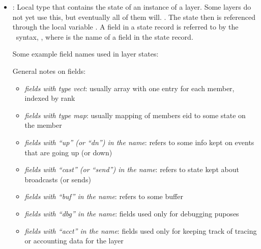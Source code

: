 \begin{itemize}
\item
{} : Local type that contains the state of an instance of a
layer.  Some layers do not yet use this, but eventually all of them will.
.  The state then is referenced
through the local variable .  A field in a state record is
referred to by the \caml\ syntax, , where  is
the name of a field in the state record.

Some example field names used in layer states:

\begin{itemize}
\end{itemize}

General notes on fields:
\begin{itemize}
\item{\em fields with type vect}: usually array with one entry for each member, indexed by rank
\item{\em fields with type map}: usually mapping of members eid to some state on the member
\item{\em fields with ``up'' (or ``dn'') in the name}: refers to some info kept on
  events that are going up (or down)
\item{\em fields with ``cast'' (or ``send'') in the name}: refers to state
  kept about broadcasts (or sends)
\item{\em fields with ``buf'' in the name}: refers to some buffer
\item{\em fields with ``dbg'' in the name}: fields used only for debugging puposes
\item{\em fields with ``acct'' in the name}: fields used only for keeping
  track of tracing or accounting data for the layer
\end{itemize}


\end{itemize}
